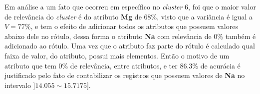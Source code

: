 Em análise a um fato que ocorreu em específico no \textit{cluster} 6, foi que o maior valor de relevância do \textit{cluster} é do atributo \textbf{Mg} de 68\%, visto que a variância é igual a ${V=77\%}$, e tem o efeito de adicionar todos os atributos que possuem valores abaixo dele no rótulo, dessa forma o atributo \textbf{Na} com relevância de 0\% também é adicionado ao rótulo. Uma vez que o atributo faz parte do rótulo é calculado  qual  faixa de valor, do atributo, possui mais elementos. Então o motivo de um atributo que tem 0\% de relevância, entre atributos, e ter 86.3\% de acurácia é justificado pelo fato de contabilizar os registros que possuem valores de \textbf{Na} no intervalo ${]14.055 \sim 15.7175 ]}$. 
% 
% 
% 
